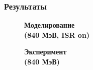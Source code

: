 \documentclass[14pt, hyperref = {colorlinks}]{beamer}
\begin{document}
\begin{frame}\label{r2}
\frametitle{Результаты}
\begin{figure}[h]
  \begin{minipage}[h]{0.49\linewidth}
    \center\textbf{Моделирование \\(840 МэВ, ISR on)}
  \end{minipage}
  \hfill
  \begin{minipage}[h]{0.49\linewidth}
    \center\textbf{Эксперимент \\(840 МэВ)}
  \end{minipage}
\end{figure}
\end{frame}
\end{document}
